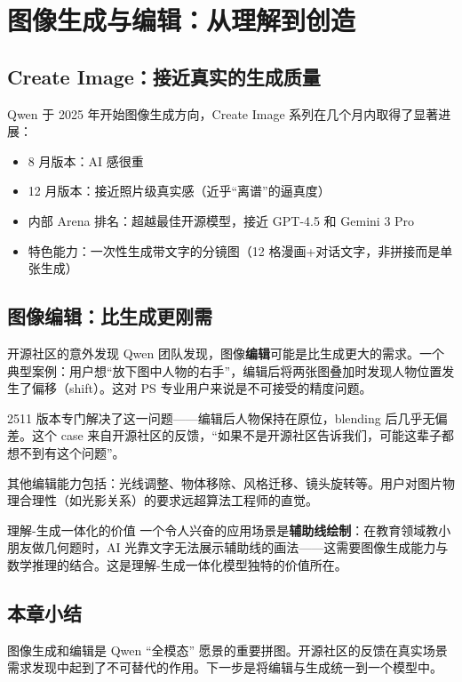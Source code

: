 \section{图像生成与编辑：从理解到创造}

\subsection{Create Image：接近真实的生成质量}

Qwen 于 2025 年开始图像生成方向，Create Image 系列在几个月内取得了显著进展：

\begin{itemize}
    \item 8 月版本：AI 感很重
    \item 12 月版本：接近照片级真实感（近乎``离谱''的逼真度）
    \item 内部 Arena 排名：超越最佳开源模型，接近 GPT-4.5 和 Gemini 3 Pro
    \item 特色能力：一次性生成带文字的分镜图（12 格漫画+对话文字，非拼接而是单张生成）
\end{itemize}

\subsection{图像编辑：比生成更刚需}

\begin{importantbox}{开源社区的意外发现}
Qwen 团队发现，图像\textbf{编辑}可能是比生成更大的需求。一个典型案例：用户想``放下图中人物的右手''，编辑后将两张图叠加时发现人物位置发生了偏移（shift）。这对 PS 专业用户来说是不可接受的精度问题。

2511 版本专门解决了这一问题——编辑后人物保持在原位，blending 后几乎无偏差。这个 case 来自开源社区的反馈，``如果不是开源社区告诉我们，可能这辈子都想不到有这个问题''。
\end{importantbox}

其他编辑能力包括：光线调整、物体移除、风格迁移、镜头旋转等。用户对图片物理合理性（如光影关系）的要求远超算法工程师的直觉。

\begin{knowledgebox}{理解-生成一体化的价值}
一个令人兴奋的应用场景是\textbf{辅助线绘制}：在教育领域教小朋友做几何题时，AI 光靠文字无法展示辅助线的画法——这需要图像生成能力与数学推理的结合。这是理解-生成一体化模型独特的价值所在。
\end{knowledgebox}

\subsection{本章小结}

图像生成和编辑是 Qwen ``全模态'' 愿景的重要拼图。开源社区的反馈在真实场景需求发现中起到了不可替代的作用。下一步是将编辑与生成统一到一个模型中。

